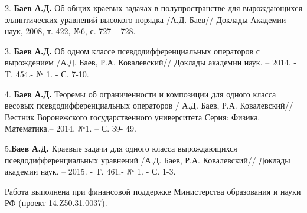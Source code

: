 2. {\bf Баев А.Д.} Об общих краевых задачах в полупространстве для вырождающихся
эллиптических уравнений высокого порядка /А.Д. Баев// Доклады Академии наук,
2008, т. 422, №6, с. 727 -- 728.

3. {\bf Баев А.Д.} Об одном классе псевдодифференциальных операторов с вырождением
/А.Д. Баев, Р.А. Ковалевский// Доклады академии наук. -- 2014. - T. 454.- №
1. - С. 7-10.

4. {\bf Баев А.Д.} Теоремы об ограниченности и композиции для одного класса весовых
псевдодифференциальных операторов / А.Д. Баев, Р.А. Ковалевский// Вестник
Воронежского государственного университета Серия: Физика. Математика.--
2014, №1. -- С. 39- 49.

5.{\bf Баев А.Д.} Краевые задачи для одного класса вырождающихся
псевдодифференциальных уравнений /А.Д. Баев, Р.А. Ковалевский// Доклады
академии наук. -- 2015. - T. 461.- № 1. - С. 1-3.

Работа выполнена при финансовой поддержке Министерства образования и науки
РФ (проект 14.Z50.31.0037).

